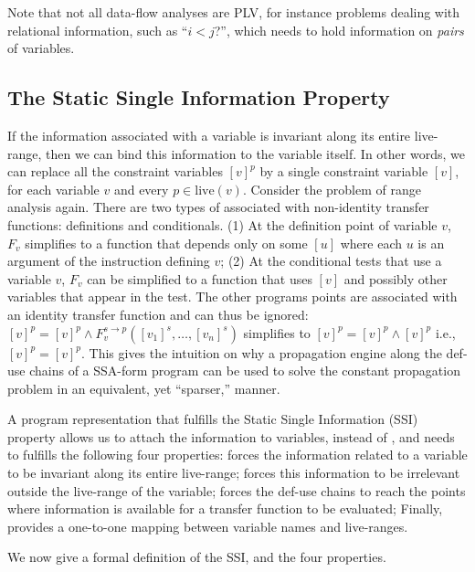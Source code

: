 {Note that not all data-flow analyses are PLV, for instance problems dealing 
with relational information, such as ``$i<j$?'', which needs to hold 
information on \emph{pairs} of variables.


\subsection{The Static Single Information Property}
\label{sec:ssi:pereira:singProp}

If the information associated with a variable is invariant along its
entire live-range, then we can bind this information to the variable itself.
In other words, we can replace all the constraint variables
$[v]^p$ by a single constraint variable $[v]$, for each variable $v$
and every $p\in \textrm{live}(v)$.  Consider the problem of range analysis 
again. There are two types of \splitpoints associated with non-identity 
transfer functions: definitions and conditionals.
(1) At the definition point of variable $v$, $F_v$ simplifies to a function that depends only on some $[u]$ where each $u$ is an argument of the instruction defining $v$;
(2) At the conditional tests that use a variable $v$, $F_v$ can be simplified to a function that uses $[v]$ and possibly other variables that appear in the test.
The other programs points are associated with an identity transfer function and 
can thus be ignored:  $[v]^p =[v]^p \wedge F_v^{s\to p}([v_1]^s, \dots, 
[v_n]^s)$ simplifies to  $[v]^p = [v]^p \wedge [v]^p$ i.e., $[v]^p = [v]^p$.  
This gives the intuition on why a propagation engine along the def-use chains 
of a SSA-form program can be used to solve the constant propagation problem in 
an equivalent, yet ``sparser,'' manner.


A program representation that fulfills the Static Single Information (SSI) 
property allows us to attach the information to variables, instead of 
\progpoints, and needs to fulfills the following four properties:
\psplit forces the information related to a variable to be invariant along its 
entire live-range;
\pinfo forces this information to be irrelevant outside the live-range of the 
variable;
\plink forces the def-use chains to reach the points where information is 
available for a transfer function to be evaluated;
Finally, \pversion provides a one-to-one mapping between variable names and 
live-ranges.

We now give a formal definition of the SSI, and the four properties.



}
